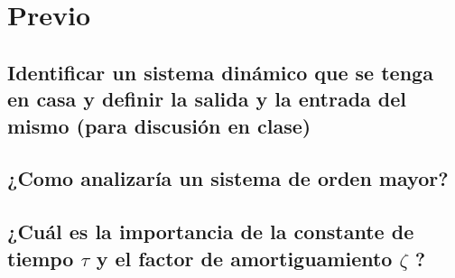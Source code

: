 \noindent \justifying

\section{Previo}

\subsection{Identificar un sistema dinámico que se tenga en casa y definir la salida y la entrada del mismo (para discusión en clase)}
\subsection{¿Como analizaría un sistema de orden mayor?}
\subsection{¿Cuál es la importancia de la constante de tiempo $\tau$ y el factor de amortiguamiento $\zeta$ ?}

